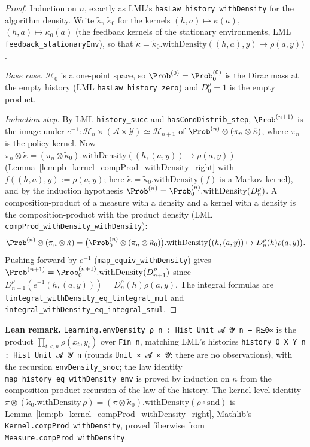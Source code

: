 \begin{proof}
\leanok
{}
Induction on $n$, exactly as LML's \texttt{hasLaw\_history\_withDensity} for the algorithm
density. Write $\tilde\kappa$, $\tilde\kappa_0$ for the kernels $(h,a)\mapsto\kappa(a)$,
$(h,a)\mapsto\kappa_0(a)$ (the feedback kernels of the stationary environments, LML
\texttt{feedback\_stationaryEnv}), so that
$\tilde\kappa = \tilde\kappa_0.\mathrm{withDensity}((h,a),y)\mapsto\rho(a,y))$.

\emph{Base case.} $\mathcal{H}_0$ is a one-point space, so $\Prob^{(0)} = \Prob_0^{(0)}$ is the
Dirac mass at the empty history (LML \texttt{hasLaw\_history\_zero}) and
$D_0^\rho = 1$ is the empty product.

\emph{Induction step.} By LML \texttt{history\_succ} and \texttt{hasCondDistrib\_step},
$\Prob^{(n+1)}$ is the image under $e^{-1} : \mathcal{H}_n\times(\mathcal{A}\times\mathcal{Y})\simeq\mathcal{H}_{n+1}$
of $\Prob^{(n)}\otimes(\pi_n\otimes\tilde\kappa)$, where $\pi_n$ is the policy kernel. Now
$\pi_n\otimes\tilde\kappa = (\pi_n\otimes\tilde\kappa_0).\mathrm{withDensity}((h,(a,y))\mapsto\rho(a,y))$
(Lemma~\ref{lem:pb_kernel_compProd_withDensity_right} with $f((h,a),y) := \rho(a,y)$; here
$\tilde\kappa = \tilde\kappa_0.\mathrm{withDensity}(f)$ is a Markov kernel), and by the
induction hypothesis
$\Prob^{(n)} = \Prob_0^{(n)}.\mathrm{withDensity}(D_n^\rho)$. A composition-product of a measure
with a density and a kernel with a density is the composition-product with the product
density (LML \texttt{compProd\_withDensity\_withDensity}):
\[
  \Prob^{(n)}\otimes(\pi_n\otimes\tilde\kappa)
  = \big(\Prob_0^{(n)}\otimes(\pi_n\otimes\tilde\kappa_0)\big).\mathrm{withDensity}\big((h,(a,y))\mapsto D_n^\rho(h)\rho(a,y)\big).
\]
Pushing forward by $e^{-1}$ (\texttt{map\_equiv\_withDensity}) gives
$\Prob^{(n+1)} = \Prob_0^{(n+1)}.\mathrm{withDensity}(D_{n+1}^\rho)$ since
$D_{n+1}^\rho(e^{-1}(h,(a,y))) = D_n^\rho(h)\rho(a,y)$. The integral formulas are
\texttt{lintegral\_withDensity\_eq\_lintegral\_mul} and
\texttt{integral\_withDensity\_eq\_integral\_smul}.
\end{proof}

\textbf{Lean remark.} \texttt{Learning.envDensity ρ n : Hist Unit 𝓐 𝓨 n → ℝ≥0∞} is the
product $\prod_{t<n}\rho(x_t,y_t)$ over \texttt{Fin n}, matching LML's histories
\texttt{history O X Y n : Hist Unit 𝓐 𝓨 n} (rounds \texttt{Unit × 𝓐 × 𝓨}: there are no
observations), with the recursion \texttt{envDensity\_snoc}; the law
identity \texttt{map\_history\_eq\_withDensity\_env} is proved by induction on $n$ from the
composition-product recursion of the law of the history. The kernel-level identity
$\pi\otimes(\tilde\kappa_0.\mathrm{withDensity}\,\rho) = (\pi\otimes\tilde\kappa_0).\mathrm{withDensity}(\rho\circ\mathrm{snd})$
is Lemma~\ref{lem:pb_kernel_compProd_withDensity_right}, Mathlib's
\texttt{Kernel.compProd\_withDensity}, proved fiberwise from
\texttt{Measure.compProd\_withDensity}.

